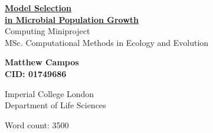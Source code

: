 \begin{titlepage}
    \begin{center}
    \vspace*{1cm}

    \Huge
    \textbf{\underline{Model Selection}}\\
    \textbf{\underline{in Microbial Population Growth}}\\

    \vspace*{0.5cm}
    \LARGE
    Computing Miniproject\\
    MSc. Computational Methods in Ecology and Evolution\\

    \vspace*{1.5cm}

    \large
    \textbf{Matthew Campos}\\
    \textbf{CID: 01749686}\\

    \vspace*{0.8cm}

    \large
    Imperial College London\\
    Department of Life Sciences\\
    \date{06 March, 2020}

    \vspace*{0.8cm}
    \large
    Word count: 3500

    \end{center}
\end{titlepage}
